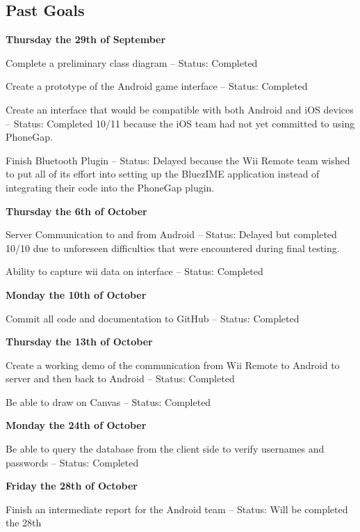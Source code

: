 \documentclass[12pt]{article}
\newenvironment{itemize*}%
  {\begin{itemize}%
  	\setlength{\parsep}{0pt}
    \setlength{\itemsep}{0pt}%
    \setlength{\parskip}{0pt}}%
  {\end{itemize}}
\begin{document}
\subsection{Past Goals}
\textbf{Thursday the 29th of September}
\begin{itemize*}
\item Complete a preliminary class diagram – Status: Completed
\item Create a prototype of the Android game interface – Status: Completed
\item Create an interface that would be compatible with both Android and iOS devices – Status: Completed 10/11 because the iOS team had not yet committed to using PhoneGap.
\item Finish Bluetooth Plugin – Status: Delayed because the Wii Remote team wished to put all of its effort into setting up the BluezIME application instead of integrating their code into the PhoneGap plugin. 
\end{itemize*}
\textbf{Thursday the 6th of October}
\begin{itemize*}
\item Server Communication to and from Android – Status: Delayed but completed 10/10 due to unforeseen difficulties that were encountered during final testing.
\item Ability to capture wii data on interface – Status: Completed
\end{itemize*}
\textbf{Monday the 10th of October}
\begin{itemize*}
\item Commit all code and documentation to GitHub – Status: Completed
\end{itemize*}
\textbf{Thursday the 13th of October}
\begin{itemize*}
\item Create a working demo of the communication from Wii Remote to Android to server and then back to Android – Status: Completed
\item Be able to draw on Canvas – Status: Completed
\end{itemize*}
\textbf{Monday the 24th of October}
\begin{itemize*}
\item Be able to query the database from the client side to verify usernames and passwords – Status: Completed
\end{itemize*}
\textbf{Friday the 28th of October}
\begin{itemize*}
\item Finish an intermediate report for the Android team – Status: Will be completed the 28th
\end{itemize*}
\end{document}
